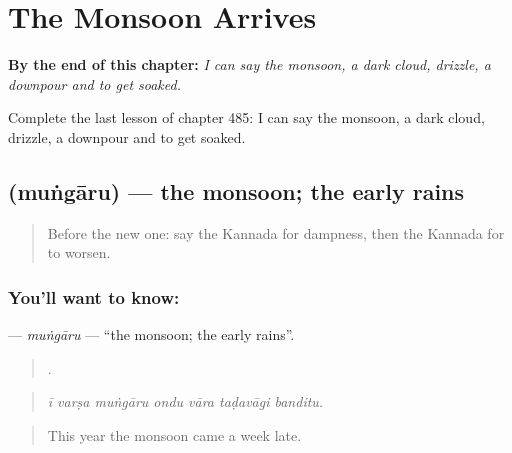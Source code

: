 
\chapter{The Monsoon Arrives}
\label{ch:ka-the-monsoon-arrives}

\begin{chapteropening}
\textbf{By the end of this chapter:} \emph{I can say the monsoon, a dark cloud, drizzle, a downpour and to get soaked.}

Complete the last lesson of chapter 485: I can say the monsoon, a dark cloud, drizzle, a downpour and to get soaked.
\end{chapteropening}

\section[\texorpdfstring{\kn{ಮುಂಗಾರು} (muṅgāru)}{ಮುಂಗಾರು (muṅgāru)}]{ (muṅgāru) — the monsoon; the early rains}

\label{lesson:KA-C485-mungaru}



\begin{quote}
Before the new one: say the Kannada for dampness, then the Kannada for to worsen.
\end{quote}

\subsection*{You'll want to know: }
\textbf{} — \emph{muṅgāru} — \textquotedblleft{}the monsoon; the early rains\textquotedblright{}.

\begin{quote}
      .
\end{quote}

\begin{quote}
\emph{ī varṣa muṅgāru ondu vāra taḍavāgi banditu.}
\end{quote}

\begin{quote}
This year the monsoon came a week late.
\end{quote}


